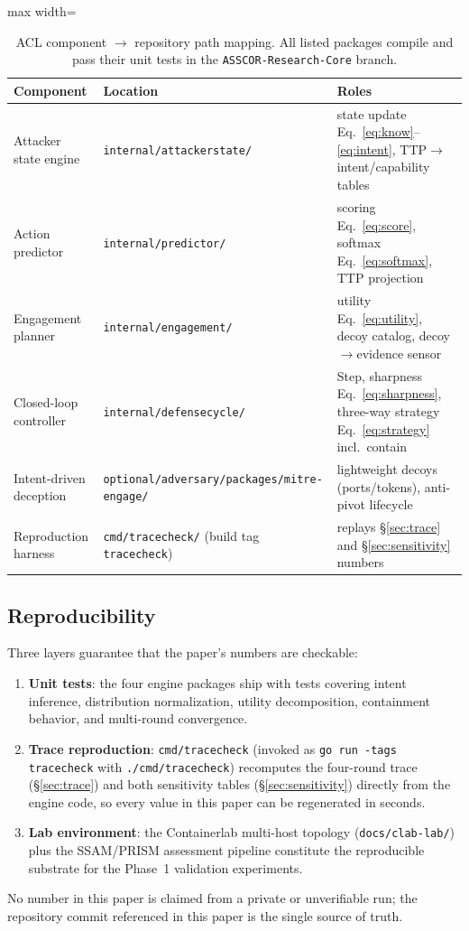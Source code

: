 \documentclass[11pt]{article}
\begin{document}
\begin{table}[ht]
\centering
\begin{adjustbox}{max width=\linewidth}\begin{tabular}{@{}lll@{}}
\toprule
\textbf{Component} & \textbf{Location} & \textbf{Roles} \\
\midrule
Attacker state engine & \texttt{internal/attackerstate/} & state update
Eq.~\ref{eq:know}--\ref{eq:intent}, TTP$\to$intent/capability tables \\
Action predictor & \texttt{internal/predictor/} & scoring
Eq.~\ref{eq:score}, softmax Eq.~\ref{eq:softmax}, TTP projection \\
Engagement planner & \texttt{internal/engagement/} & utility
Eq.~\ref{eq:utility}, decoy catalog, decoy$\to$evidence sensor \\
Closed-loop controller & \texttt{internal/defensecycle/} & Step,
sharpness Eq.~\ref{eq:sharpness}, three-way strategy
Eq.~\ref{eq:strategy} incl.\ contain \\
Intent-driven deception & \texttt{optional/adversary/packages/mitre-engage/} &
lightweight decoys (ports/tokens), anti-pivot lifecycle \\
Reproduction harness & \texttt{cmd/tracecheck/} (build tag
\texttt{tracecheck}) & replays \S\ref{sec:trace} and
\S\ref{sec:sensitivity} numbers \\
\bottomrule
\end{tabular}\end{adjustbox}
\caption{ACL component $\to$ repository path mapping. All listed packages
compile and pass their unit tests in the \texttt{ASSCOR-Research-Core}
branch.}
\label{tab:repo-map}
\end{table}

\subsection{Reproducibility}

Three layers guarantee that the paper's numbers are checkable:
\begin{enumerate}
\item \textbf{Unit tests}: the four engine packages ship with tests covering
      intent inference, distribution normalization, utility decomposition,
      containment behavior, and multi-round convergence.
\item \textbf{Trace reproduction}: \texttt{cmd/tracecheck} (invoked as
      \texttt{go run -tags tracecheck} with \texttt{./cmd/tracecheck})
      recomputes the four-round trace (\S\ref{sec:trace}) and both sensitivity tables
      (\S\ref{sec:sensitivity}) directly from the engine code, so every
      value in this paper can be regenerated in seconds.
\item \textbf{Lab environment}: the Containerlab multi-host topology
      (\texttt{docs/clab-lab/}) plus the SSAM/PRISM assessment pipeline
      constitute the reproducible substrate for the Phase~1 validation
      experiments.
\end{enumerate}
No number in this paper is claimed from a private or unverifiable run; the
repository commit referenced in this paper is the single source of truth.
\end{document}
